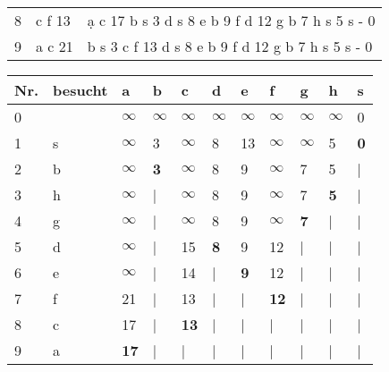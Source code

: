 \documentclass{lehramt-informatik-aufgabe}
\begin{document}
\begin{enumerate}
\begin{liAntwort}
\begin{tabular}{l|l|l}
8 & \D c f {13} &
\scriptsize
\d a c {17}
\D b s 3
\D d s 8
\D e b 9
\D f d {12}
\D g b 7
\D h s 5
\D s - 0
\\

9 & \D a c {21} &
\scriptsize
\D b s 3
\D c f {13}
\D d s 8
\D e b 9
\D f d {12}
\D g b 7
\D h s 5
\D s - 0
\\

\end{tabular}
\end{liAntwort}


\begin{liAntwort}
\begin{tabular}{lllllllllll}
\bf{Nr.}     & \bf{besucht} & \bf{a}       & \bf{b}       & \bf{c}       & \bf{d}       & \bf{e}       & \bf{f}       & \bf{g}       & \bf{h}       & \bf{s}       \\
\hline
0            &              & $\infty$     & $\infty$     & $\infty$     & $\infty$     & $\infty$     & $\infty$     & $\infty$     & $\infty$     & 0            \\
1            & s            & $\infty$     & 3            & $\infty$     & 8            & 13           & $\infty$     & $\infty$     & 5            & \bf{0}       \\
2            & b            & $\infty$     & \bf{3}       & $\infty$     & 8            & 9            & $\infty$     & 7            & 5            & |            \\
3            & h            & $\infty$     & |            & $\infty$     & 8            & 9            & $\infty$     & 7            & \bf{5}       & |            \\
4            & g            & $\infty$     & |            & $\infty$     & 8            & 9            & $\infty$     & \bf{7}       & |            & |            \\
5            & d            & $\infty$     & |            & 15           & \bf{8}       & 9            & 12           & |            & |            & |            \\
6            & e            & $\infty$     & |            & 14           & |            & \bf{9}       & 12           & |            & |            & |            \\
7            & f            & 21           & |            & 13           & |            & |            & \bf{12}      & |            & |            & |            \\
8            & c            & 17           & |            & \bf{13}      & |            & |            & |            & |            & |            & |            \\
9            & a            & \bf{17}      & |            & |            & |            & |            & |            & |            & |            & |            \\
\end{tabular}


\end{liAntwort}
\end{enumerate}
\end{document}
